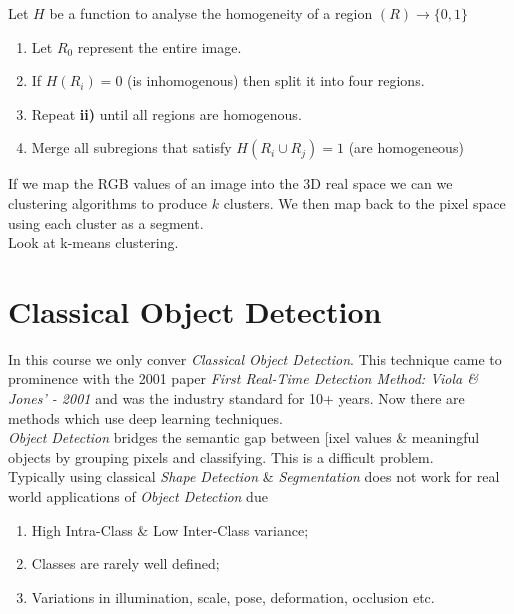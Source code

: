 \documentclass[11pt,a4paper]{article}
\begin{document}
Let $H$ be a function to analyse the homogeneity of a region $(R)\to\{0,1\}$
\begin{enumerate}[label=\roman*)]
	\item Let $R_0$ represent the entire image.
	\item If $H(R_i)=0$ (\ie is inhomogenous) then split it into four regions.
	\item Repeat \textbf{ii)} until all regions are homogenous.
	\item Merge all subregions that satisfy $H(R_i\cup R_j)=1$ (\ie are homogeneous)
\end{enumerate}

If we map the RGB values of an image into the 3D real space we can we clustering algorithms to produce $k$ clusters. We then map back to the pixel space using each cluster as a segment.\\
\nb Look at k-means clustering.

\section{Classical Object Detection}

In this course we only conver \textit{Classical Object Detection}. This technique came to prominence with the 2001 paper \textit{First Real-Time Detection Method: Viola \& Jones' - 2001} and was the industry standard for 10+ years. Now there are methods which use deep learning techniques.\\

\textit{Object Detection} bridges the semantic gap between [ixel values \& meaningful objects by grouping pixels and classifying. This is a difficult problem.\\

Typically using classical \textit{Shape Detection} \& \textit{Segmentation} does not work for real world applications of \textit{Object Detection} due
\begin{enumerate}[label=\roman*)]
	\item High Intra-Class \& Low Inter-Class variance;
	\item Classes are rarely well defined;
	\item Variations in illumination, scale, pose, deformation, occlusion etc.
\end{enumerate}
\end{document}
